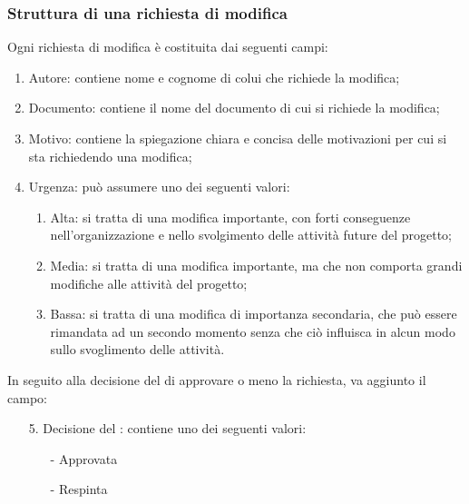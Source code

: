 		\subsubsection{Struttura di una richiesta di modifica}
			Ogni richiesta di modifica è costituita dai seguenti campi:
			\begin{enumerate}
				\item Autore: contiene nome e cognome di colui che richiede la modifica;
				\item Documento: contiene il nome del documento di cui si richiede la modifica;
				\item Motivo: contiene la spiegazione chiara e concisa delle motivazioni per cui si sta richiedendo una modifica;
				\item Urgenza: può assumere uno dei seguenti valori:
					\begin{enumerate}
						\item Alta: si tratta di una modifica importante, con forti conseguenze nell'organizzazione e nello svolgimento delle attività future del progetto;
						\item Media: si tratta di una modifica importante, ma che non comporta grandi modifiche alle attività del progetto;
						\item Bassa: si tratta di una modifica di importanza secondaria, che può essere rimandata ad un secondo momento senza che ciò influisca in alcun modo sullo svoglimento delle attività.
					\end{enumerate}
			\end{enumerate}
			In seguito alla decisione del  di approvare o meno la richiesta, va aggiunto il campo:
			\begin{itemize}
				\item [5.] Decisione del : contiene uno dei seguenti valori:
					\begin{itemize}
						\item [-] Approvata
						\item [-] Respinta
					\end{itemize}
			\end{itemize}
	
